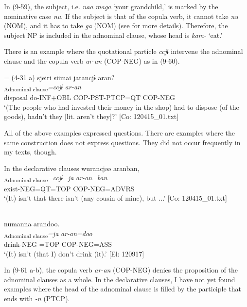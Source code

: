 In (9-59), the subject, i.e. \textit{naa} \textit{maga} ‘your grandchild,’ is marked by the nominative case \textit{nu}. If the subject is that of the copula verb, it cannot take \textit{nu} (NOM), and it has to take \textit{ga} (NOM) (see  for more details). Therefore, the subject NP is included in the adnominal clause, whose head is \textit{kam-} ‘eat.’

There is an example where the quotational particle \textit{ccjɨ} intervene the adnominal clause and the copula verb \textit{ar-an} (COP-NEG) as in (9-60). 

\ea{} = (4-31 a) \label{ex:9.60}
 \glll  {\textbar}sjeiri{\textbar}  siimai  jatancjɨ  aran?\\
    [\textit{sjeiri}  \textit{sɨr-i+mai}  \textit{jar-tar-n}]\textsubscript{Adnominal clause}\textit{=ccjɨ}  \textit{ar-an}\\
    disposal  do-INF+OBL  COP-PST-PTCP=QT  COP-NEG\\
    \glt     ‘(The people who had invested their money in the shop) had to dispose (of the goods), hadn’t they [lit. aren’t they]?’ [Co: 120415\_01.txt]
\z

  All of the above examples expressed questions. There are examples where the same construction does not express questions. They did not occur frequently in my texts, though.

\ea   In the declarative clauses \label{ex:9.61}
\ea %
\glll   wurancjəə  aranban,\\
      [\textit{wur-an}]\textsubscript{Adnominal clause}\textit{=ccjɨ=ja}  \textit{ar-an=ban}\\
      exist-NEG=QT=TOP  COP-NEG=ADVRS\\
      \glt       ‘(It) isn’t that there isn’t (any cousin of mine), but ...’ [Co: 120415\_01.txt]

\ex{}\\
    \glll  numanna  arandoo.\\
      [\textit{num-an}]\textsubscript{Adnominal clause}\textit{=ja}  \textit{ar-an=doo}\\
      drink-NEG =TOP  COP-NEG=ASS\\
      \glt       ‘(It) isn’t (that I) don’t drink (it).’ [El: 120917]
    \z
\z

In (9-61 a-b), the copula verb \textit{ar-an} (COP-NEG) denies the proposition of the adnominal clauses as a whole. In the declarative clauses, I have not yet found examples where the head of the adnominal clause is filled by the participle that ends with \textit{{}-n} (PTCP).

